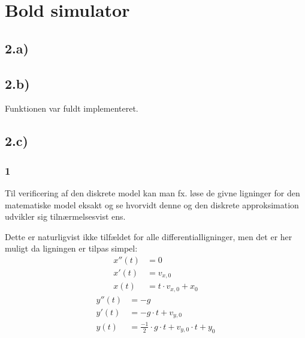 \section{Bold simulator}
\subsection*{2.a)}


\subsection*{2.b)}
Funktionen var fuldt implementeret.

\subsection*{2.c)}
\subsubsection*{1}
Til verificering af den diskrete model kan man fx. løse de givne ligninger for den matematiske model
eksakt og se hvorvidt denne og den diskrete approksimation udvikler sig tilnærmelsesvist ens.

Dette er naturligvist ikke tilfældet for alle differentialligninger, men det er her muligt da ligningen
er tilpas simpel:
\begin{align}
x''(t) 	&= 0 \\
x'(t) 	&= v_{x,0} \\
x(t) 	&= t \cdot v_{x,0} + x_0 
\end{align}
\begin{align}
y''(t)	&= -g \\
y'(t)	&= -g \cdot t + v_{y,0} \\
y(t)	&= \frac{-1}{2} \cdot g \cdot t + v_{y,0} \cdot t + y_0
\end{align}

